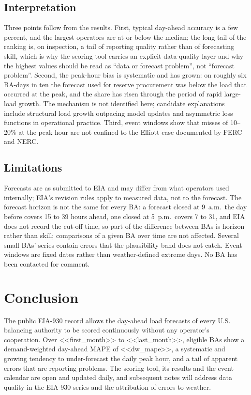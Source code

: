 \documentclass[conference]{IEEEtran}
\begin{document}
\subsection{Interpretation}
Three points follow from the results. First, typical day-ahead accuracy is a few percent, and the largest operators are at or below the median; the long tail of the ranking is, on inspection, a tail of reporting quality rather than of forecasting skill, which is why the scoring tool carries an explicit data-quality layer and why the highest values should be read as ``data or forecast problem'', not ``forecast problem''. Second, the peak-hour bias is systematic and has grown: on roughly six BA-days in ten the forecast used for reserve procurement was below the load that occurred at the peak, and the share has risen through the period of rapid large-load growth. The mechanism is not identified here; candidate explanations include structural load growth outpacing model updates and asymmetric loss functions in operational practice. Third, event windows show that misses of 10--20\% at the peak hour are not confined to the Elliott case documented by FERC and NERC.

\subsection{Limitations}
Forecasts are as submitted to EIA and may differ from what operators used internally; EIA's revision rules apply to measured data, not to the forecast. The forecast horizon is not the same for every BA: a forecast closed at 9~a.m.\ the day before covers 15 to 39 hours ahead, one closed at 5~p.m.\ covers 7 to 31, and EIA does not record the cut-off time, so part of the difference between BAs is horizon rather than skill; comparisons of a given BA over time are not affected. Several small BAs' series contain errors that the plausibility band does not catch. Event windows are fixed dates rather than weather-defined extreme days. No BA has been contacted for comment.

\section{Conclusion}
The public EIA-930 record allows the day-ahead load forecasts of every U.S. balancing authority to be scored continuously without any operator's cooperation. Over <<first_month>> to <<last_month>>, eligible BAs show a demand-weighted day-ahead MAPE of <<dw_mape>>, a systematic and growing tendency to under-forecast the daily peak hour, and a tail of apparent errors that are reporting problems. The scoring tool, its results and the event calendar are open and updated daily, and subsequent notes will address data quality in the EIA-930 series and the attribution of errors to weather.
\end{document}
